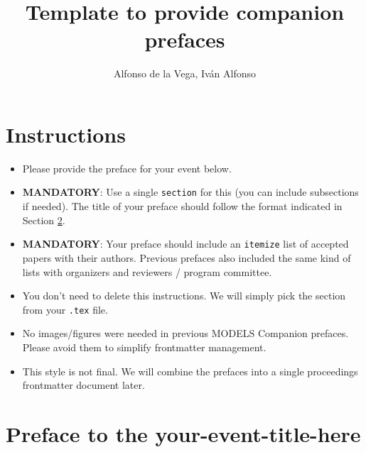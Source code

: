 \documentclass[]{article}
\title{Template to provide companion prefaces}
\author{Alfonso de la Vega, Iván Alfonso}
\begin{document}
\maketitle

\section{Instructions}

\begin{itemize}

\item Please provide the preface for your event below.

\item \textbf{MANDATORY}: Use a single \texttt{section} for this (you can include subsections if needed).
The title of your preface should follow the format indicated in Section \ref{sec:preface}.

\item \textbf{MANDATORY}: Your preface should include an \texttt{itemize} list of accepted papers with their authors. Previous prefaces also included the same kind of lists with organizers and reviewers / program committee.

\item You don't need to delete this instructions. We will simply pick the section from your \texttt{.tex} file.

\item No images/figures were needed in previous MODELS Companion prefaces. Please avoid them to simplify frontmatter management.

\item This style is not final. We will combine the prefaces into a single proceedings frontmatter document later.
\end{itemize}

\section{Preface to the your-event-title-here}
\label{sec:preface}
\end{document}
